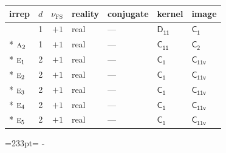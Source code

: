 \documentclass[10pt,a4paper]{article}
\newcommand{\needspace}[1]{\par\penalty-100\begingroup\dimen0=#1\relax\dimen2=\pagegoal
  \advance\dimen2-\pagetotal\ifdim\dimen0>\dimen2\relax\ifdim\dimen2>0pt\vfil\break\fi\fi
  \endgroup}
\numberwithin{equation}{section}
\newcommand{\grp}[1]{\mathsf{#1}}
\newcommand{\irr}[1]{\text{\normalfont\scshape #1}}
\newcommand{\detbox}[1]{{\setlength{\fboxsep}{1pt}\fbox{#1}}}
\newcommand{\fsind}{\nu_{\mathrm{FS}}}
\begin{document}
{\small\renewcommand{\arraystretch}{1.25}\begin{longtable}{@{}lrrllll@{}}\toprule
irrep & $d$ & $\fsind$ & reality & conjugate & kernel & image\\\midrule\endhead
\bottomrule\endfoot\endlastfoot
\detbox{$\irr{a}_{1}$} & 1 & $+1$ & real & --- & \href{D11.pdf}{$\grp{D_{11}}$} & \href{C1.pdf}{$\grp{C_{1}}$}\\*
$\irr{a}_{2}$ & 1 & $+1$ & real & --- & \href{C11.pdf}{$\grp{C_{11}}$} & \href{C2.pdf}{$\grp{C_{2}}$}\\*
$\irr{e}_{1}$ & 2 & $+1$ & real & --- & \href{C1.pdf}{$\grp{C_{1}}$} & \href{C11v.pdf}{$\grp{C_{11v}}$}\\*
$\irr{e}_{2}$ & 2 & $+1$ & real & --- & \href{C1.pdf}{$\grp{C_{1}}$} & \href{C11v.pdf}{$\grp{C_{11v}}$}\\*
$\irr{e}_{3}$ & 2 & $+1$ & real & --- & \href{C1.pdf}{$\grp{C_{1}}$} & \href{C11v.pdf}{$\grp{C_{11v}}$}\\*
$\irr{e}_{4}$ & 2 & $+1$ & real & --- & \href{C1.pdf}{$\grp{C_{1}}$} & \href{C11v.pdf}{$\grp{C_{11v}}$}\\*
$\irr{e}_{5}$ & 2 & $+1$ & real & --- & \href{C1.pdf}{$\grp{C_{1}}$} & \href{C11v.pdf}{$\grp{C_{11v}}$}\\
\bottomrule\end{longtable}}
\needspace{233pt}
\end{document}
